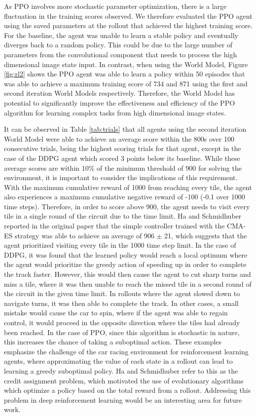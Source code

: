 As PPO involves more stochastic parameter optimization, there is a large fluctuation in the training scores observed. We therefore evaluated the PPO agent using the saved parameters at the rollout that achieved the highest training score. For the baseline, the agent was unable to learn a stable policy and eventually diverges back to a random policy. This could be due to the large number of parameters from the convolutional component that needs to process the high dimensional image state input. In contrast, when using the World Model, Figure \ref{fig:rl2} shows the PPO agent was able to learn a policy within 50 episodes that was able to achieve a maximum training score of 734 and 871 using the first and second iteration World Models respectively. Therefore, the World Model has potential to significantly improve the effectiveness and efficiency of the PPO algorithm for learning complex tasks from high dimensional image states.

It can be observed in Table \ref{tab:trials} that all agents using the second iteration World Model were able to achieve an average score within the 800s over 100 consecutive trials, being the highest scoring trials for that agent, except in the case of the DDPG agent which scored 3 points below its baseline. While these average scores are within 10\% of the minimum threshold of 900 for solving the environment, it is important to consider the implications of this requirement. With the maximum cumulative reward of 1000 from reaching every tile, the agent also experiences a maximum cumulative negative reward of -100 (-0.1 over 1000 time steps). Therefore, in order to score above 900, the agent needs to visit every tile in a single round of the circuit due to the time limit. Ha and Schmidhuber reported in the original paper that the simple controller trained with the CMA-ES strategy was able to achieve an average of 906 $\pm$ 21, which suggests that the agent prioritized visiting every tile in the 1000 time step limit. In the case of DDPG, it was found that the learned policy would reach a local optimum where the agent would prioritize the greedy action of speeding up in order to complete the track faster. However, this would then cause the agent to cut sharp turns and miss a tile, where it was then unable to reach the missed tile in a second round of the circuit in the given time limit. In rollouts where the agent slowed down to navigate turns, it was then able to complete the track. In other cases, a small mistake would cause the car to spin, where if the agent was able to regain control, it would proceed in the opposite direction where the tiles had already been reached. In the case of PPO, since this algorithm is stochastic in nature, this increases the chance of taking a suboptimal action. These examples emphasize the challenge of the car racing environment for reinforcement learning agents, where approximating the value of each state in a rollout can lead to learning a greedy suboptimal policy. Ha and Schmidhuber refer to this as the credit assignment problem, which motivated the use of evolutionary algorithms which optimize a policy based on the total reward from a rollout. Addressing this problem in deep reinforcement learning would be an interesting area for future work.

